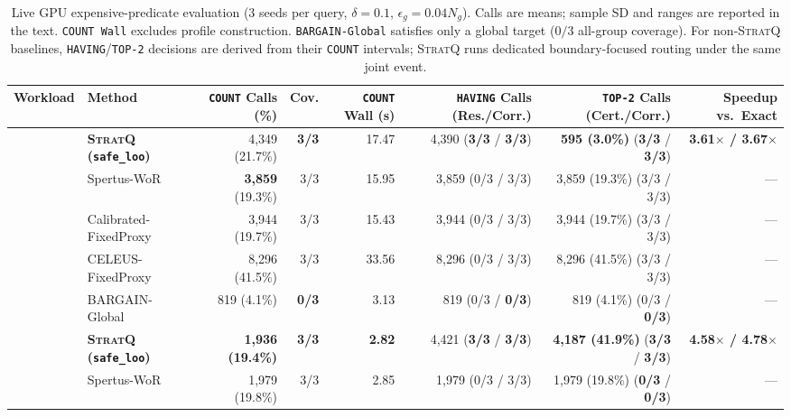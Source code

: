 \begin{table}[t]
\centering
\footnotesize
\setlength{\tabcolsep}{4pt}
\caption{Live GPU expensive-predicate evaluation (3 seeds per query, $\delta=0.1$, $\epsilon_g=0.04 N_g$). Calls are means; sample SD and ranges are reported in the text. \texttt{COUNT Wall} excludes profile construction. \texttt{BARGAIN-Global} satisfies only a global target ($0/3$ all-group coverage). For non-\textsc{StratQ} baselines, \texttt{HAVING}/\texttt{TOP-2} decisions are derived from their \texttt{COUNT} intervals; \textsc{StratQ} runs dedicated boundary-focused routing under the same joint event.}
\label{tab:gpu-main}
\begin{tabular}{@{}llrrrrrr@{}}
\toprule
Workload & Method & \texttt{COUNT} Calls (\%) & Cov. & \texttt{COUNT} Wall (s) & \texttt{HAVING} Calls (Res./Corr.) & \texttt{TOP-2} Calls (Cert./Corr.) & Speedup vs.\ Exact \\
\midrule
{}
& \textbf{\textsc{StratQ} (\texttt{safe\_loo})} & 4,349 (21.7\%) & \textbf{3/3} & 17.47 & 4,390 (\textbf{3/3} / \textbf{3/3}) & \textbf{595 (3.0\%)} (\textbf{3/3} / \textbf{3/3}) & \textbf{3.61$\times$ / 3.67$\times$} \\
& Spertus-WoR~\cite{spertus2026sequential} & \textbf{3,859} (19.3\%) & 3/3 & 15.95 & 3,859 (0/3 / 3/3) & 3,859 (19.3\%) (3/3 / 3/3) & --- \\
& Calibrated-FixedProxy & 3,944 (19.7\%) & 3/3 & 15.43 & 3,944 (0/3 / 3/3) & 3,944 (19.7\%) (3/3 / 3/3) & --- \\
& CELEUS-FixedProxy~\cite{zhou2026celeus} & 8,296 (41.5\%) & 3/3 & 33.56 & 8,296 (0/3 / 3/3) & 8,296 (41.5\%) (3/3 / 3/3) & --- \\
& BARGAIN-Global~\cite{zeighami2026bargain} & 819 (4.1\%) & \textbf{0/3} & 3.13 & 819 (0/3 / \textbf{0/3}) & 819 (4.1\%) (0/3 / \textbf{0/3}) & --- \\
\midrule
{}
& \textbf{\textsc{StratQ} (\texttt{safe\_loo})} & \textbf{1,936 (19.4\%)} & \textbf{3/3} & \textbf{2.82} & 4,421 (\textbf{3/3} / \textbf{3/3}) & \textbf{4,187 (41.9\%)} (\textbf{3/3} / \textbf{3/3}) & \textbf{4.58$\times$ / 4.78$\times$} \\
& Spertus-WoR~\cite{spertus2026sequential} & 1,979 (19.8\%) & 3/3 & 2.85 & 1,979 (0/3 / 3/3) & 1,979 (19.8\%) (\textbf{0/3} / \textbf{0/3}) & --- \\

\end{tabular}
\end{table}
